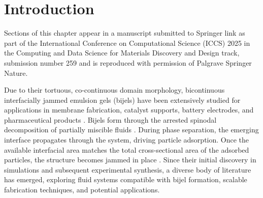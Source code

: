 \section{Introduction}

Sections of this chapter appear in a manuscript submitted to Springer link as part of the International Conference on Computational 
Science (ICCS) 2025 in the Computing and Data Science for Materials Discovery and Design track, submission number 259 and is
reproduced with permission of Palgrave Springer Nature. 


Due to their tortuous, co-continuous domain morphology, bicontinuous interfacially jammed emulsion gels (bijels) have been 
extensively studied for applications in membrane fabrication, catalyst supports, battery electrodes, and pharmaceutical 
products \cite{yabuno_preparation_2020, samdani_bicontinuous_2017, cha_bicontinuous_2019, garcia_scalable_2019, santiago_cordoba_aerobijels_2020}.  
Bijels form through the arrested spinodal decomposition of partially miscible fluids 
\cite{stratford_colloidal_2005, herzig_bicontinuous_2007, tavacoli_novel_2011}. During phase separation, the emerging interface propagates 
through the system, driving particle adsorption. Once the available interfacial area matches the total cross-sectional area of the adsorbed 
particles, the structure becomes jammed in place \cite{stratford_colloidal_2005, herzig_bicontinuous_2007, tavacoli_novel_2011}. Since their 
initial discovery in simulations and subsequent experimental synthesis, a diverse body of literature has emerged, exploring fluid systems 
compatible with bijel formation, scalable fabrication techniques, and potential applications.


